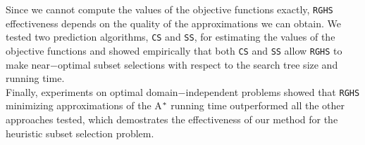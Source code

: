 Since we cannot compute the values of the objective functions exactly, \texttt{RGHS} effectiveness depends on the quality of the approximations we can obtain. We tested two prediction algorithms, \texttt{CS} and \texttt{SS}, for estimating the values of the objective functions and showed empirically that both \texttt{CS} and \texttt{SS} allow \texttt{RGHS} to make near$-$optimal subset selections with respect to the search tree size and running time.\\

Finally, experiments on optimal domain$-$independent problems showed that \texttt{RGHS} minimizing approximations of the A$\sp{*}$ running time outperformed all the other approaches tested, which demostrates the effectiveness of our method for the heuristic subset selection problem.

\clearpage